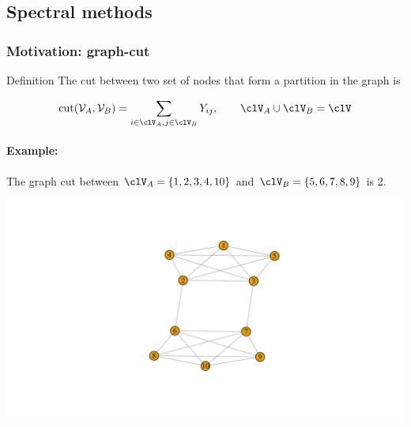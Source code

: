 \documentclass{beamer}\usepackage[]{graphicx}\usepackage[]{color}
\newenvironment{knitrout}{}{} %
\begin{document}
\subsection{Spectral methods}

\begin{frame}[fragile]
  \frametitle{Motivation: graph-cut}
  
  \begin{block}{Definition}
    The cut between two set of nodes that form a partition in the graph is

$$
\mathrm{cut}(\mathcal{V}_A, \mathcal{V}_B) = \sum_{i\in\clV_A, j\in\clV_B} Y_{ij}, \qquad \clV_A \cup \clV_B = \clV
$$
\end{block}

\paragraph{Example:}
The graph cut between $\clV_A= \{1,2,3,4,10\}$ and $\clV_B= \{5,6,7,8,9\}$ is 2.

\begin{knitrout}\scriptsize
{}\color{fgcolor}
\includegraphics[width=.8\textwidth]{figures/graph-cut-plot-1} 
\end{knitrout}

\end{frame}
\end{document}
